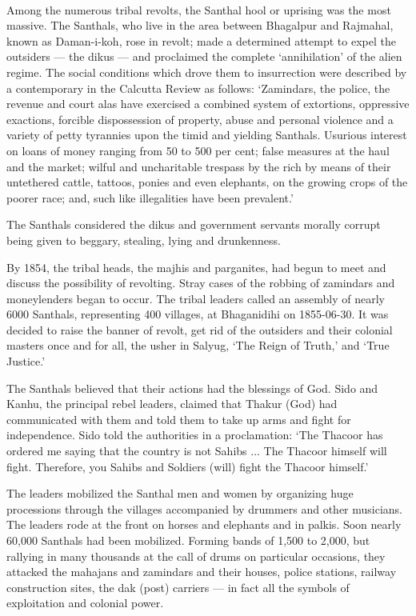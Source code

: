 \paragraph*{}
Among the numerous tribal revolts, the Santhal hool or uprising was the most massive. The Santhals, who live in the area between Bhagalpur and Rajmahal, known as Daman-i-koh, rose in revolt; made a determined attempt to expel the outsiders — the dikus — and proclaimed the complete `annihilation' of the alien regime. The social conditions which drove them to insurrection were described by a contemporary in the Calcutta Review as follows: `Zamindars, the police, the revenue and court alas have exercised a combined system of extortions, oppressive exactions, forcible dispossession of property, abuse and personal violence and a variety of petty tyrannies upon the timid and yielding Santhals. Usurious interest on loans of money ranging from 50 to 500 per cent; false measures at the haul and the market; wilful and uncharitable trespass by the rich by means of their untethered cattle, tattoos, ponies and even elephants, on the growing crops of the poorer race; and, such like illegalities have been prevalent.'

The Santhals considered the dikus and government servants morally corrupt being given to beggary, stealing, lying and drunkenness.

By 1854, the tribal heads, the majhis and parganites, had begun to meet and discuss the possibility of revolting. Stray cases of the robbing of zamindars and moneylenders began to occur. The tribal leaders called an assembly of nearly 6000 Santhals, representing 400 villages, at Bhaganidihi on 1855-06-30. It was decided to raise the banner of revolt, get rid of the outsiders and their colonial masters once and for all, the usher in Salyug, `The Reign of Truth,' and `True Justice.'

The Santhals believed that their actions had the blessings of God. Sido and Kanhu, the principal rebel leaders, claimed that Thakur (God) had communicated with them and told them to take up arms and fight for independence. Sido told the authorities in a proclamation: `The Thacoor has ordered me saying that the country is not Sahibs ... The Thacoor himself will fight. Therefore, you Sahibs and Soldiers (will) fight the Thacoor himself.'

The leaders mobilized the Santhal men and women by organizing huge processions through the villages accompanied by drummers and other musicians. The leaders rode at the front on horses and elephants and in palkis. Soon nearly 60,000 Santhals had been mobilized. Forming bands of 1,500 to 2,000, but rallying in many thousands at the call of drums on particular occasions, they attacked the mahajans and zamindars and their houses, police stations, railway construction sites, the dak (post) carriers — in fact all the symbols of exploitation and colonial power.

